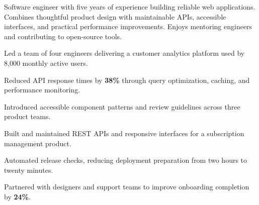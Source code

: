 

Software engineer with five years of experience building reliable web applications.
Combines thoughtful product design with maintainable APIs, accessible interfaces,
and practical performance improvements. Enjoys mentoring engineers and contributing
to open-source tools.

\begin{highlights}
  \item Led a team of four engineers delivering a customer analytics platform
    used by 8,000 monthly active users.
  \item Reduced API response times by \textbf{38\%} through query optimization,
    caching, and performance monitoring.
  \item Introduced accessible component patterns and review guidelines across
    three product teams.
\end{highlights}

\begin{highlights}
  \item Built and maintained REST APIs and responsive interfaces for a
    subscription management product.
  \item Automated release checks, reducing deployment preparation from two
    hours to twenty minutes.
  \item Partnered with designers and support teams to improve onboarding
    completion by \textbf{24\%}.
\end{highlights}

